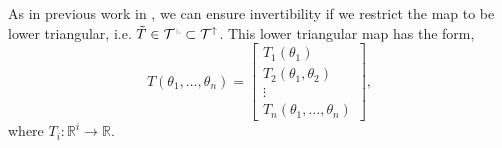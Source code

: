 \documentclass[final]{siamltex}
\newcommand{\ltri}{%
\,\resizebox{!}{0.25\baselineskip}{%
\begin{tikzpicture}%
\draw[line width=1mm](0,0) -- (0,2) -- (2,0)  -- (0,0);
\end{tikzpicture}%
}\xspace%
}%
\begin{document}

As in previous work in \cite{parno2014transport}, we can ensure
invertibility if we restrict the map to be lower triangular, i.e. $\tilde{T} \in \mathcal{T}^{\ltri}\subset\mathcal{T}^\uparrow$. This lower triangular map has the form,
\[
	T(\theta_1, \dots, \theta_n) = \begin{bmatrix} T_1(\theta_1) \\ T_2(\theta_1, \theta_2) \\ \vdots \\
		T_n(\theta_1, \dots, \theta_n) \end{bmatrix},
\]
where $T_i\colon \mathbb{R}^i \to \mathbb{R}$. %
\end{document}

